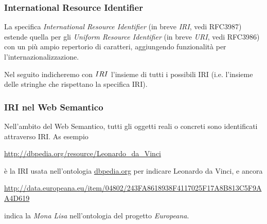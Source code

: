 \documentclass[8pt]{beamer}
\begin{document}
% 
% 

\begin{frame}
\frametitle{International Resource Identifier}

La specifica \emph{International Resource Identifier} (in breve \emph{IRI},
vedi RFC3987) estende quella per gli \emph{Uniform Resource Identifier} (in breve \emph{URI},
vedi RFC3986) con un pi\`u ampio repertorio di caratteri, aggiungendo
funzionalit\`a per l'internazionalizzazione.
\vspace{\baselineskip}

Nel seguito indicheremo con $IRI$ l'insieme di tutti
i possibili IRI (i.e. l'insieme delle stringhe che rispettano la 
specifica IRI).
\end{frame}

\begin{frame}
\frametitle{IRI nel Web Semantico}
Nell'ambito del Web Semantico, tutti gli oggetti reali o concreti sono
identificati attraverso IRI. As esempio
\begin{center}
 \url{http://dbpedia.org/resource/Leonardo_da_Vinci}
\end{center}
\`e la IRI usata nell'ontologia \url{dbpedia.org} per indicare
Leonardo da Vinci, e ancora 
\begin{center}
  \begin{small}
    \url{http://data.europeana.eu/item/04802/243FA8618938F4117025F17A8B813C5F9AA4D619}
  \end{small}
\end{center}
indica la \emph{Mona Lisa} nell'ontologia del progetto \emph{Europeana}.
\end{frame}
\end{document}
